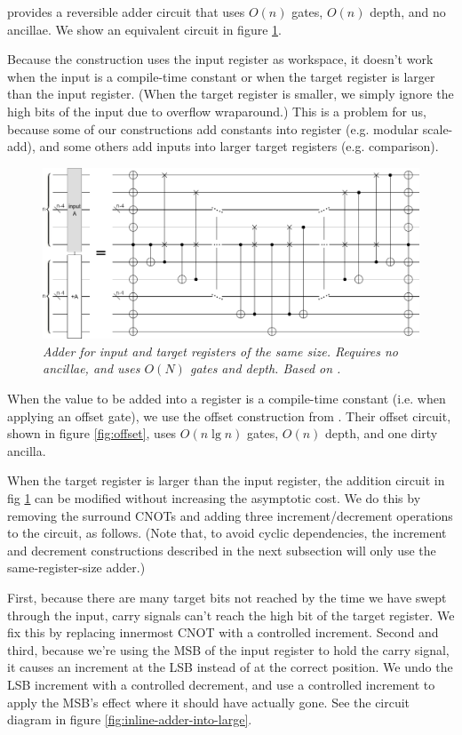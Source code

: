\documentclass[twocolumn]{article}
\begin{document}
\cite{takahashi2005} provides a reversible adder circuit that uses $O(n)$ gates, $O(n)$ depth, and no ancillae.
We show an equivalent circuit in figure \ref{fig:inlineadder}.

Because the construction uses the input register as workspace, it doesn't work when the input is a compile-time constant or when the target register is larger than the input register.
(When the target register is smaller, we simply ignore the high bits of the input due to overflow wraparound.)
This is a problem for us, because some of our constructions add constants into register (e.g. modular scale-add), and some others add inputs into larger target registers (e.g. comparison).

\begin{figure}
  \centering
  \includegraphics[width=\linewidth]{assets/inline-adder.png}
  \caption{\em Adder for input and target registers of the same size.
  Requires no ancillae, and uses $O(N)$ gates and depth.
  Based on \cite{van2004, takahashi2005}.}
  \label{fig:inlineadder}
\end{figure}

When the value to be added into a register is a compile-time constant (i.e. when applying an offset gate), we use the offset construction from \cite{haner2016}.
Their offset circuit, shown in figure \ref{fig:offset}, uses $O(n \lg n)$ gates, $O(n)$ depth, and one dirty ancilla.

When the target register is larger than the input register, the addition circuit in fig \ref{fig:inlineadder} can be modified without increasing the asymptotic cost.
We do this by removing the surround CNOTs and adding three increment/decrement operations to the circuit, as follows.
(Note that, to avoid cyclic dependencies, the increment and decrement constructions described in the next subsection will only use the same-register-size adder.)

First, because there are many target bits not reached by the time we have swept through the input, carry signals can't reach the high bit of the target register.
We fix this by replacing innermost CNOT with a controlled increment.
Second and third, because we're using the MSB of the input register to hold the carry signal, it causes an increment at the LSB instead of at the correct position.
We undo the LSB increment with a controlled decrement, and use a controlled increment to apply the MSB's effect where it should have actually gone.
See the circuit diagram in figure \ref{fig:inline-adder-into-large}.
\end{document}
